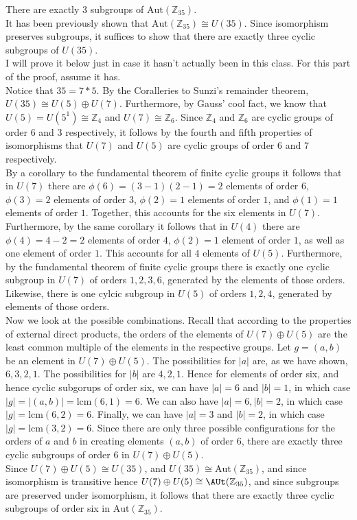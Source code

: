 \documentclass{article}
\newcommand{\lcm}{\mbox{lcm}}
\newcommand{\Aut}{\mbox{Aut}}
\newcommand{\Z}{\mathbb{Z}}
\begin{document}
 There are exactly $3$ subgroups of $\Aut(\Z_{35})$. \\

It has been previously shown that $\Aut(\Z_{35})\cong U(35)$. Since isomorphism preserves subgroups, it suffices to show that there are exactly three cyclic subgroups of $U(35)$.\\
I will prove it below just in case it hasn't actually been in this class. For this part of the proof, assume it has.\\

Notice that $35 = 7*5$. By the Coralleries to Sunzi's remainder theorem, $U(35)\cong U(5)\oplus U(7)$. Furthermore, by Gauss' cool fact, we know that $U(5) = U(5^1)\cong \Z_4$ and $U(7)\cong \Z_6$. Since $\Z_4$ and $\Z_6$ are cyclic groups of order 6 and 3 respectively, it follows by the fourth and fifth properties of isomorphisms that $U(7)$ and $U(5)$ are cyclic groups of order $6$ and $7$ respectively. \\

By a corollary to the fundamental theorem of finite cyclic groups it follows that in $U(7)$ there are $\phi(6) = (3-1)(2-1) = 2$ elements of order 6, $\phi(3) = 2$ elements of order $3$, $\phi(2) = 1$ elements of order $1$, and $\phi(1) = 1$ elements of order $1$. Together, this accounts for the six elements in $U(7)$. Furthermore, by the same corollary it follows that in $U(4)$ there are $\phi(4) = 4-2 = 2$ elements of order $4$, $\phi(2) = 1$ element of order $1$, as well as one element of order $1$. This accounts for all $4$ elements of $U(5)$. Furthermore, by the fundamental theorem of finite cyclic groups there is exactly one cyclic subgroup in $U(7)$ of orders $1,2,3,6$, generated by the elements of those orders. Likewise, there is one cylcic subgroup in $U(5)$ of orders $1,2,4$, generated by elements of those orders. \\

Now we look at the possible combinations. Recall that according to the properties of external direct products, the orders of the elements of $U(7)\oplus U(5)$ are the least common multiple of the elements in the respective groups. Let $g = (a,b)$ be an element in $U(7)\oplus U(5)$. The possibilities for $|a|$ are, as we have shown, $6,3,2,1$. The possibilities for $|b|$ are $4,2,1$. Hence for elements of order six, and hence cyclic subgorups of order six, we can have $|a| = 6$ and $|b| = 1$, in which case $|g| = |(a,b)| = \lcm(6,1) = 6$. We can also have $|a| = 6, |b| = 2$, in which case $|g| = \lcm(6,2) = 6$. Finally, we can have $|a| = 3$ and $|b| = 2$, in which case $|g| = \lcm(3,2) = 6$. Since there are only three possible configurations for the orders of $a$ and $b$ in creating elements $(a,b)$ of order 6, there are exactly three cyclic subgroups of order $6$ in $U(7)\oplus U(5)$. \\
Since $U(7)\oplus U(5)\cong U(35)$, and $U(35) \cong \Aut(\Z_{35})$, and since isomorphism is transitive hence $U(7)\oplus U(5)\cong \AUt(\Z_{35})$, and since subgroups are preserved under isomorphism, it follows that there are exactly three cyclic subgroups of order six in $\Aut(\Z_{35}).$\\
\end{document}
